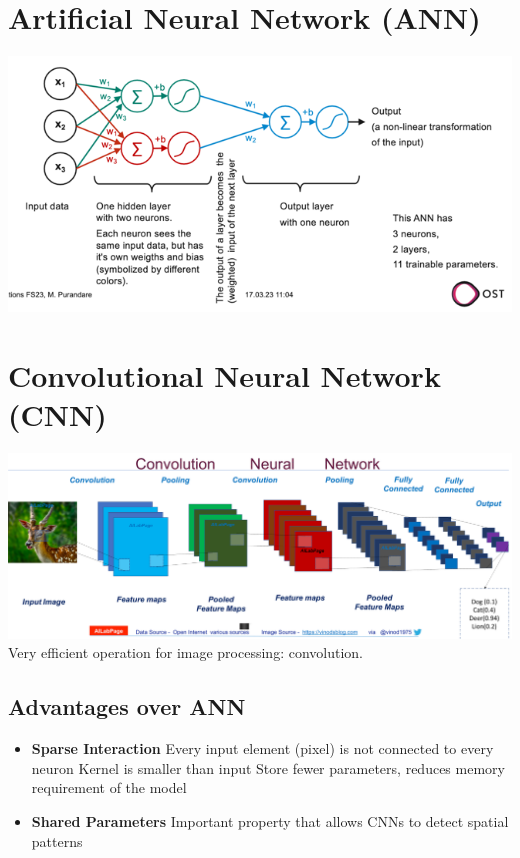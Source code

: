 \documentclass[a4paper, landscape, 10pt]{scrartcl}
\begin{document}
    \begin{multicols*}{3}
        \setlength{\columnseprule}{0pt}
        \footnotesize

        \section{Artificial Neural Network (ANN)}
        \includegraphics[width=\columnwidth]{graphic/03-neural-network}

        \section{Convolutional Neural Network (CNN)}
        \includegraphics[width=\columnwidth]{graphic/02-convolution-architecture}
        Very efficient operation for image processing: convolution.

        \subsection{Advantages over ANN}
        \begin{itemize}
            \item \textbf{Sparse Interaction}
            \subitem Every input element (pixel) is not connected to every neuron
            \subitem Kernel is smaller than input
            \subitem Store fewer parameters, reduces memory requirement of the model
            \item \textbf{Shared Parameters}
            \subitem Important property that allows CNNs to detect spatial patterns
            \subitem
            \subitem
            \subitem
        \end{itemize}
        

\end{multicols*}
\end{document}
